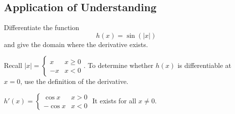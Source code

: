 

\subsection*{Application of Understanding}


\begin{question}[2010H]
Differentiate the function \[h(x) = \sin(|x|)\] and give the domain where the derivative exists.
\end{question}
\begin{hint}
Recall $|x|=\left\{\begin{array}{rl}
x&x\ge 0\\
-x&x<0
\end{array}\right.$. To determine whether $h(x)$ is differentiable at $x=0$, use the definition of the derivative.
\end{hint}
\begin{answer}
$h'(x)=\left\{\begin{array}{rl}
\cos x&x> 0\\
-\cos x&x<0
\end{array}\right.$ It exists for all $x \neq 0$.
\end{answer}
